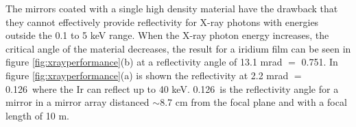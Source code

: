 %
The mirrors coated with a single high density material have the drawback that they cannot effectively provide reflectivity for X-ray photons with energies outside the 0.1 to 5 keV range. When the X-ray photon energy increases, the critical angle of the material decreases, the result for a iridium film can be seen in figure \ref{fig:xrayperformance}(b) at a reflectivity angle of 13.1 mrad $=$ 0.751\degr. In figure \ref{fig:xrayperformance}(a) is shown the reflectivity at 2.2 mrad $=$ 0.126\degr\ where the Ir can reflect up to 40 keV. 0.126\degr\ is the reflectivity angle for a mirror in a mirror array distanced $\sim$8.7 cm from the focal plane and with a focal length of 10 m.

